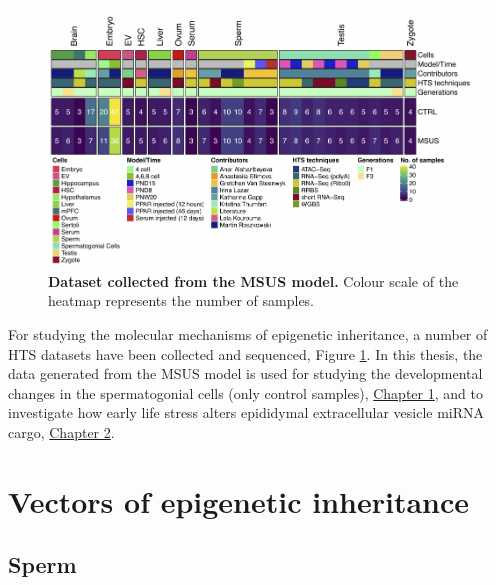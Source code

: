 \documentclass[12pt,twoside]{reedthesis}
\begin{document}
\begin{figure}[htbp]

{\centering \includegraphics{thesis_files/figure-latex/if5-1} 

}

\caption[Dataset collected from the MSUS model]{\textbf{Dataset collected from the MSUS model.} Colour scale
of the heatmap represents the number of samples.}\label{fig:if5}
\end{figure}
For studying the molecular mechanisms of epigenetic inheritance, a
number of HTS datasets have been collected and sequenced, Figure
\ref{fig:if5}. In this thesis, the data generated from the MSUS model is
used for studying the developmental changes in the spermatogonial cells
(only control samples), \protect\hyperlink{chapter1}{Chapter 1}, and to investigate how
early life stress alters epididymal extracellular vesicle miRNA cargo,
\protect\hyperlink{chapter2}{Chapter 2}.

\hypertarget{vectors-of-epigenetic-inheritance}{%
\section*{Vectors of epigenetic inheritance}\label{vectors-of-epigenetic-inheritance}}

\hypertarget{sperm}{%
\subsection*{Sperm}\label{sperm}}
\end{document}
